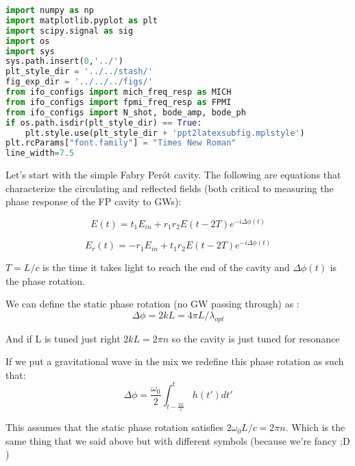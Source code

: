 \begin{spacing}{1.2} \begin{lstlisting}[frame=single, language=Python]
import numpy as np 
import matplotlib.pyplot as plt
import scipy.signal as sig
import os
import sys
sys.path.insert(0,'../')
plt_style_dir = '../../stash/'
fig_exp_dir = '../../../figs/'
from ifo_configs import mich_freq_resp as MICH
from ifo_configs import fpmi_freq_resp as FPMI
from ifo_configs import N_shot, bode_amp, bode_ph
if os.path.isdir(plt_style_dir) == True:
    plt.style.use(plt_style_dir + 'ppt2latexsubfig.mplstyle')
plt.rcParams["font.family"] = "Times New Roman"
line_width=7.5
\end{lstlisting} \end{spacing}

\noindent Let's start with the simple Fabry Perót cavity. The following are
equations that characterize the circulating and reflected fields (both
critical to measuring the phase response of the FP cavity to GWs):

\begin{equation}\label{eq:fpmi1}
E(t) = t_1 E_{in} + r_1 r_2 E(t - 2T) e^{-i \Delta \phi(t)} 
\end{equation}

\begin{equation}\label{eq:fpmi2}
E_r(t) = -r_1 E_{in} + t_1 r_2 E(t - 2T) e^{-i \Delta \phi(t)}
\end{equation}

\noindent \(T = L/c\) is the time it takes light to reach the end of the cavity
and \(\Delta \phi(t)\) is the phase rotation.

\noindent We can define the static phase rotation (no GW passing through) as :
\begin{equation}\Delta \phi = 2kL = 4 \pi L /\lambda_{opt}  \end{equation}

\noindent And if L is tuned just right \(2kL = 2 \pi n\) so the cavity is just
tuned for resonance

\noindent If we put a gravitational wave in the mix we redefine this phase
rotation as such that:
\begin{equation}\Delta \phi =  \frac{\omega_0}{2} \int_{t-\frac{2L}{c}}^{t} h(t')dt' \end{equation}

\noindent This assumes that the static phase rotation satisfies
\(2\omega_0L/c = 2 \pi n\). Which is the same thing that we said above
but with different symbols (because we're fancy ;D )

